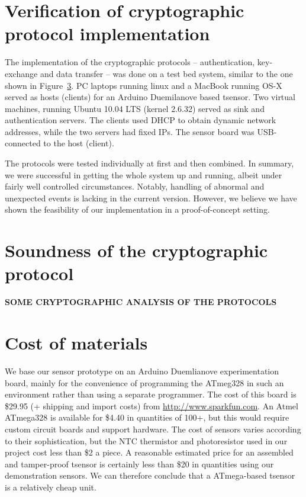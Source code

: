 \section{Verification of cryptographic protocol implementation}

The implementation of the cryptographic protocols -- authentication, key-exchange and data transfer -- was done on a test bed system, similar to the one shown in Figure~\ref{}. PC laptops running linux and a MacBook running OS-X served as hosts (clients) for an Arduino Duemilanove based tsensor. Two virtual machines, running Ubuntu 10.04 LTS (kernel 2.6.32) served as sink and authentication servers. The clients used DHCP to obtain dynamic network addresses, while the two servers had fixed IPs. The sensor board was USB-connected to the host (client).

The protocols were tested individually at first and then combined. In summary, we were successful in getting the whole system up and running, albeit under fairly well controlled circumstances. Notably, handling of abnormal and unexpected events is lacking in the current version. However, we believe we have shown the feasibility of our implementation in a proof-of-concept setting.

\section{Soundness of the cryptographic protocol}

\textbf{SOME CRYPTOGRAPHIC ANALYSIS OF THE PROTOCOLS}

\section{Cost of materials}

We base our sensor prototype on an Arduino Duemlianove experimentation board, mainly for the convenience of programming the ATmeg328 in such an environment rather than using a separate programmer. The cost of this board is \$29.95 (+ shipping and import costs) from \url{http://www.sparkfun.com}. An Atmel ATmega328 is available for \$4.40 in quantities of 100+, but this would require custom circuit boards and support hardware. The cost of sensors varies according to their sophistication, but the NTC thermistor and photoresistor used in our project cost less than \$2 a piece. A reasonable estimated price for an assembled and tamper-proof tsensor is certainly less than \$20 in quantities using our demonstration sensors. We can therefore conclude that a ATmega-based tsensor is a relatively cheap unit.

